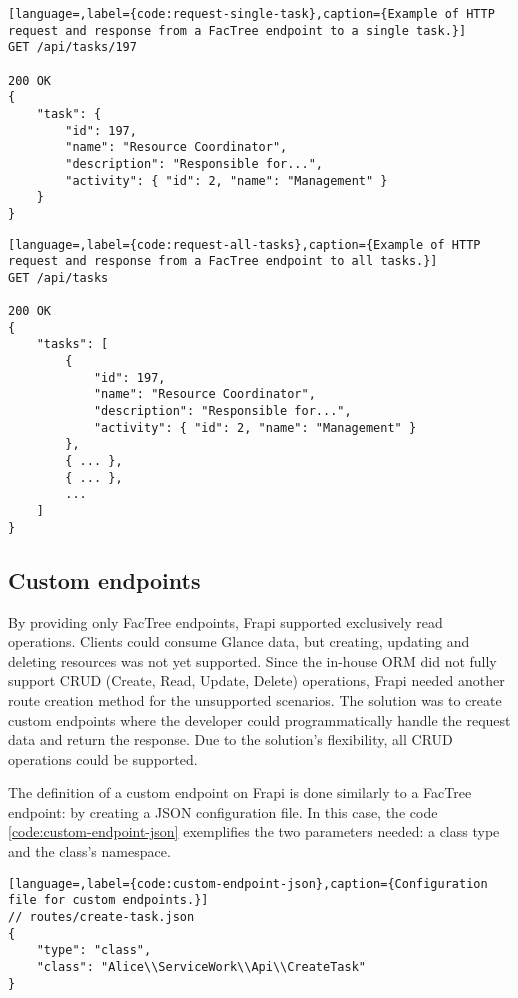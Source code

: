 \begin{lstlisting}[language=,label={code:request-single-task},caption={Example of HTTP request and response from a FacTree endpoint to a single task.}]
GET /api/tasks/197

200 OK
{
	"task": {
		"id": 197,
		"name": "Resource Coordinator",
		"description": "Responsible for...",
		"activity": { "id": 2, "name": "Management"	}
	}
}
\end{lstlisting}

\begin{lstlisting}[language=,label={code:request-all-tasks},caption={Example of HTTP request and response from a FacTree endpoint to all tasks.}]
GET /api/tasks

200 OK
{
	"tasks": [
		{
			"id": 197,
			"name": "Resource Coordinator",
			"description": "Responsible for...",
			"activity": { "id": 2, "name": "Management" }
		},
		{ ... },
		{ ... },
		...
	]
}
\end{lstlisting}

\subsection{Custom endpoints}
\label{sec:custom-endpoints}

By providing only FacTree endpoints, Frapi supported exclusively read operations. Clients could consume Glance data, but creating, updating and deleting resources was not yet supported. Since the in-house ORM did not fully support CRUD (Create, Read, Update, Delete) operations, Frapi needed another route creation method for the unsupported scenarios. The solution was to create custom endpoints where the developer could programmatically handle the request data and return the response. Due to the solution's flexibility, all CRUD operations could be supported.

The definition of a custom endpoint on Frapi is done similarly to a FacTree endpoint: by creating a JSON configuration file. In this case, the code \autoref{code:custom-endpoint-json} exemplifies the two parameters needed: a class type and the class's namespace.

\begin{lstlisting}[language=,label={code:custom-endpoint-json},caption={Configuration file for custom endpoints.}]
// routes/create-task.json
{
    "type": "class",
    "class": "Alice\\ServiceWork\\Api\\CreateTask"
}
\end{lstlisting}

